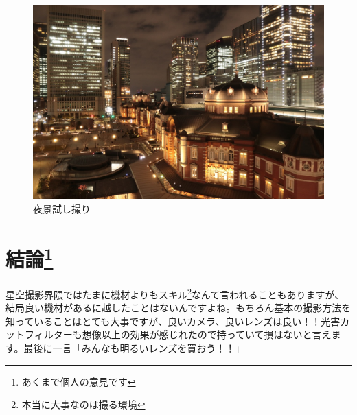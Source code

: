\documentclass[a4paper.10pt]{jarticle}
\begin{document}
\begin{figure}[H]
\begin{center}
  \includegraphics[width=14cm]{tokyo.jpg}
\caption{夜景試し撮り}
\label{}
\end{center}
\end{figure}
\section{結論\footnote{あくまで個人の意見です}}
星空撮影界隈ではたまに機材よりもスキル\footnote{本当に大事なのは撮る環境}なんて言われることもありますが、結局良い機材があるに越したことはないんですよね。もちろん基本の撮影方法を知っていることはとても大事ですが、良いカメラ、良いレンズは良い！！光害カットフィルターも想像以上の効果が感じれたので持っていて損はないと言えます。最後に一言「みんなも明るいレンズを買おう！！」
\end{document}
